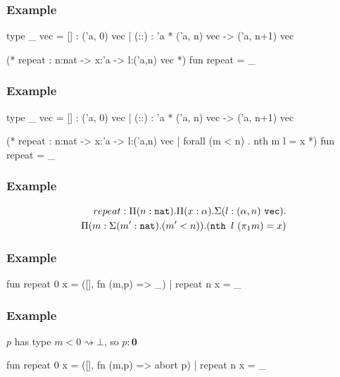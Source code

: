 \documentclass[usenames,dvipsnames]{beamer}
\begin{document}

\begin{frame}[fragile]
  \frametitle{Example}

  \begin{code}
    type _ vec = [] : ('a, 0) vec
               | (::) : 'a * ('a, n) vec -> ('a, n+1) vec

    (* repeat : {n:nat} -> {x:'a} -> {l:('a,n) vec} *)
    fun repeat = _
  \end{code}
\end{frame}


\begin{frame}[fragile]
  \frametitle{Example}

  \begin{code}
    type _ vec = [] : ('a, 0) vec
               | (::) : 'a * ('a, n) vec -> ('a, n+1) vec

    (* repeat : {n:nat} -> {x:'a} ->
       {l:('a,n) vec | forall (m < n) . nth m l = x}
     *)
    fun repeat = _
  \end{code}
\end{frame}


\begin{frame}[fragile]
  \frametitle{Example}

  \begin{align*}
    repeat : \Pi(n:\tNat) . \Pi(x:\alpha) . \Sigma(l:(\alpha,n)\ \texttt{vec})
    . \\
    \Pi(m: \Sigma (m':\tNat) . (m' < n)) . (\texttt{nth }l\ (\pi_1m) = x)
  \end{align*}
\end{frame}


\begin{frame}[fragile]
  \frametitle{Example}

  \begin{code}
    fun repeat 0 x = ([], fn (m,p) => _)
      | repeat n x = _
  \end{code}
\end{frame}


\newcommand{\tAbort}[1]{\texttt{abort}\ #1}

\begin{frame}[fragile]
  \frametitle{Example}

  $p$ has type $m < 0 \rightsquigarrow \bot$, so $p : \textbf{0}$
  \begin{code}
    fun repeat 0 x = ([], fn (m,p) => abort p)
      | repeat n x = _
  \end{code}
\end{frame}
\end{document}
